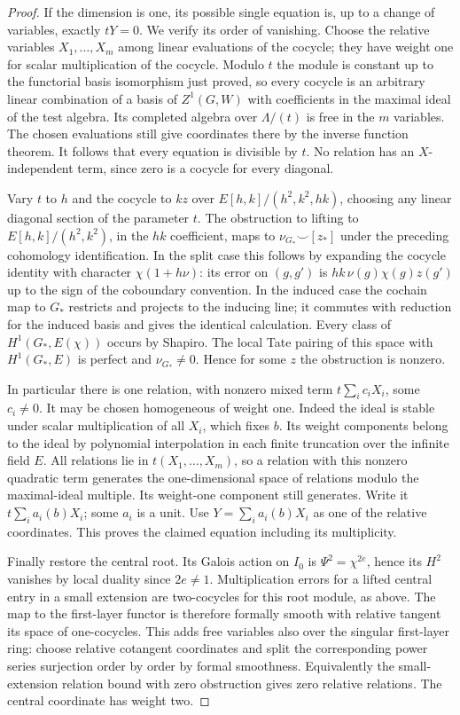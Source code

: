 \begin{proof}
If the dimension is one, its possible single equation is, up to a
change of variables, exactly \(tY=0\). We verify its order of
vanishing. Choose the relative variables \(X_1,\ldots,X_m\) among
linear evaluations of the cocycle; they have weight one for scalar
multiplication of the cocycle. Modulo \(t\) the module is constant
up to the functorial basis isomorphism just proved, so every cocycle
is an arbitrary linear combination of a basis of \(Z^1(G,W)\) with
coefficients in the maximal ideal of the test algebra. Its completed
algebra over \(\Lambda/(t)\) is free in the \(m\) variables. The
chosen evaluations still give coordinates there by the inverse
function theorem. It follows that every equation is divisible by
\(t\). No relation has an \(X\)-independent term, since zero is
a cocycle for every diagonal.

Vary \(t\) to \(h\) and the cocycle to \(kz\) over
\(E[h,k]/(h^2,k^2,hk)\), choosing any linear diagonal section of
the parameter \(t\). The obstruction to lifting to
\(E[h,k]/(h^2,k^2)\), in the \(hk\) coefficient, maps to
\(\nu_{G_*}\smile [z_*]\) under the preceding cohomology
identification. In the split case this follows by expanding the
cocycle identity with character \(\chi(1+h\nu)\): its error on
\((g,g')\) is \(hk\,\nu(g)\chi(g)z(g')\) up to the sign of the
coboundary convention. In the induced case the cochain map to
\(G_*\) restricts and projects to the inducing line; it commutes
with reduction for the induced basis and gives the identical
calculation. Every class of \(H^1(G_*,E(\chi))\) occurs by
Shapiro. The local Tate pairing of this space with \(H^1(G_*,E)\)
is perfect and \(\nu_{G_*}\ne0\). Hence for some \(z\) the
obstruction is nonzero.

In particular there is one relation, with nonzero mixed term
\(t\sum_i c_i X_i\), some \(c_i\ne0\). It may be chosen
homogeneous of weight one. Indeed the ideal is stable under scalar
multiplication of all \(X_i\), which fixes \(b\). Its weight
components belong to the ideal by polynomial interpolation in each
finite truncation over the infinite field \(E\). All relations lie
in \(t(X_1,\ldots,X_m)\), so a relation with this nonzero
quadratic term generates the one-dimensional space of relations
modulo the maximal-ideal multiple. Its weight-one component still
generates. Write it \(t\sum_i a_i(b)X_i\); some \(a_i\) is a
unit. Use \(Y=\sum_i a_i(b)X_i\) as one of the relative
coordinates. This proves the claimed equation including its
multiplicity.

Finally restore the central root. Its Galois action on \(I_0\)
is \(\Psi^2=\chi^{2e}\), hence its \(H^2\) vanishes by local
duality since \(2e\ne1\). Multiplication errors for a lifted
central entry in a small extension are two-cocycles for this root
module, as above. The map to the first-layer functor is therefore
formally smooth with relative tangent its space of one-cocycles.
This adds free variables also over the singular first-layer ring:
choose relative cotangent coordinates and split the corresponding
power series surjection order by order by formal smoothness.
Equivalently the small-extension relation bound with zero obstruction
gives zero relative relations. The central coordinate has weight two.


\end{proof}
